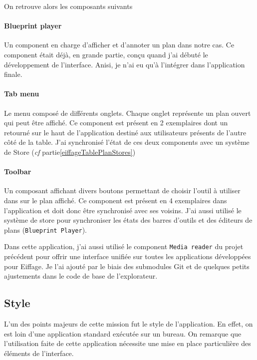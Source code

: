On retrouve alors les composants suivants

\paragraph{Blueprint player} Un component en charge d'afficher et d'annoter un plan dans notre cas.
Ce component était déjà, en grande partie, conçu quand j'ai débuté le développement de l'interface.
Anisi, je n'ai eu qu'à l'intégrer dans l'application finale.

\paragraph{Tab menu} Le menu composé de différents onglets.
Chaque onglet représente un plan ouvert qui peut être affiché.
Ce component est présent en 2 exemplaires dont un retourné sur le haut de l'application destiné aux utilisateurs présents de l'autre côté de la table.
J'ai synchronisé l'état de ces deux components avec un système de Store (\emph{cf} partie\ref{eiffageTablePlanStores})

\paragraph{Toolbar} Un composant affichant divers boutons permettant de choisir l'outil à utiliser dans sur le plan affiché.
Ce component est présent en 4 exemplaires dans l'application et doit donc être synchronisé avec ses voisins.
J'ai aussi utilisé le système de store pour synchroniser les états des barres d'outils et des éditeurs de plans (\texttt{Blueprint Player}).

\bigskip

Dans cette application, j'ai aussi utilisé le component \texttt{Media reader} du projet précédent pour offrir une interface unifiée sur toutes les applications développées pour Eiffage.
Je l'ai ajouté par le biais des submodules Git et de quelques petits ajustements dans le code de base de l'explorateur.

\subsection{Style}
\label{eiffageTablePlanStyle}

L'un des points majeurs de cette mission fut le style de l'application.
En effet, on est loin d'une application standard exécutée sur un bureau.
On remarque que l'utilisation faite de cette application nécessite une mise en place particulière des éléments de l'interface.


